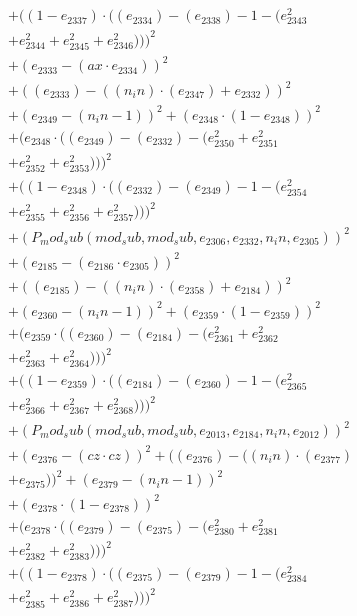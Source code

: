 \documentclass[10pt, a4paper]{article}
\begin{document}
\begin{align*}
& + ((1 - e_{2337})  \cdot  ((e_{2334}) - (e_{2338}) - 1 - (e_{2343}^{2} \\
& + e_{2344}^{2} + e_{2345}^{2} + e_{2346}^{2})))^{2} \\
& + (e_{2333} - (ax  \cdot  e_{2334}))^{2} \\
& + ((e_{2333}) - ((n_in)  \cdot  (e_{2347}) + e_{2332}))^{2} \\
& + (e_{2349} - (n_in - 1))^{2} + (e_{2348}  \cdot  (1 - e_{2348}))^{2} \\
& + (e_{2348}  \cdot  ((e_{2349}) - (e_{2332}) - (e_{2350}^{2} + e_{2351}^{2} \\
& + e_{2352}^{2} + e_{2353}^{2})))^{2} \\
& + ((1 - e_{2348})  \cdot  ((e_{2332}) - (e_{2349}) - 1 - (e_{2354}^{2} \\
& + e_{2355}^{2} + e_{2356}^{2} + e_{2357}^{2})))^{2} \\
& + (P_mod_sub(mod_sub, mod_sub, e_{2306}, e_{2332}, n_in, e_{2305}))^{2} \\
& + (e_{2185} - (e_{2186}  \cdot  e_{2305}))^{2} \\
& + ((e_{2185}) - ((n_in)  \cdot  (e_{2358}) + e_{2184}))^{2} \\
& + (e_{2360} - (n_in - 1))^{2} + (e_{2359}  \cdot  (1 - e_{2359}))^{2} \\
& + (e_{2359}  \cdot  ((e_{2360}) - (e_{2184}) - (e_{2361}^{2} + e_{2362}^{2} \\
& + e_{2363}^{2} + e_{2364}^{2})))^{2} \\
& + ((1 - e_{2359})  \cdot  ((e_{2184}) - (e_{2360}) - 1 - (e_{2365}^{2} \\
& + e_{2366}^{2} + e_{2367}^{2} + e_{2368}^{2})))^{2} \\
& + (P_mod_sub(mod_sub, mod_sub, e_{2013}, e_{2184}, n_in, e_{2012}))^{2} \\
& + (e_{2376} - (cz  \cdot  cz))^{2} + ((e_{2376}) - ((n_in)  \cdot  (e_{2377}) \\
& + e_{2375}))^{2} + (e_{2379} - (n_in - 1))^{2} \\
& + (e_{2378}  \cdot  (1 - e_{2378}))^{2} \\
& + (e_{2378}  \cdot  ((e_{2379}) - (e_{2375}) - (e_{2380}^{2} + e_{2381}^{2} \\
& + e_{2382}^{2} + e_{2383}^{2})))^{2} \\
& + ((1 - e_{2378})  \cdot  ((e_{2375}) - (e_{2379}) - 1 - (e_{2384}^{2} \\
& + e_{2385}^{2} + e_{2386}^{2} + e_{2387}^{2})))^{2} \\

\end{align*}
\end{document}
